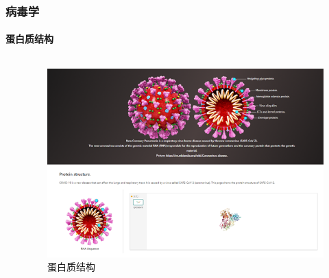 \documentclass[UTF8,aspectratio=169]{ctexbeamer}
\begin{document}
    \begin{frame}
        \frametitle{病毒学}
        \framesubtitle{蛋白质结构}
        \begin{columns}
            \begin{column}{0.4\textwidth}

            \end{column}
            \begin{column}{0.6\textwidth}
                \begin{figure}[H]
                    \includegraphics[width=\linewidth]{virus}
                    \caption{蛋白质结构\cite{msracn}\label{fig:virus}}
                \end{figure}
            \end{column}
        \end{columns}
    \end{frame}
\end{document}
